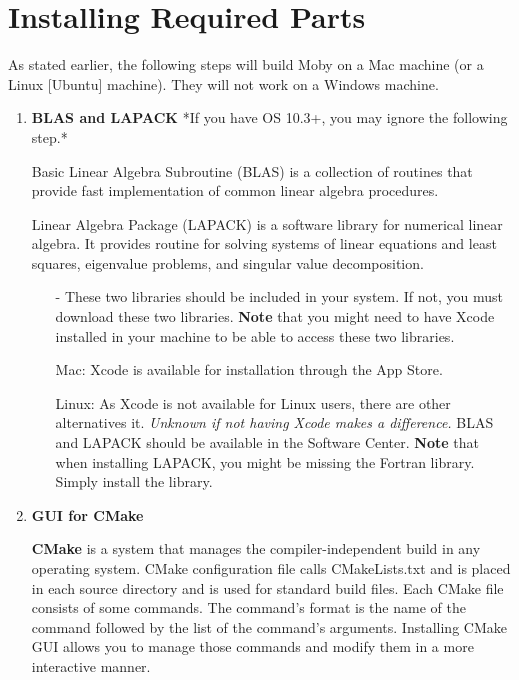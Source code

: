 \documentclass[11pt, letterpaper]{article}
\begin{document}
\section{Installing Required Parts}
As stated earlier, the following steps will build Moby on a Mac machine (or a Linux [Ubuntu] machine). They will not work on a Windows machine.

\begin{enumerate}
\item {\bfseries BLAS and LAPACK} 
\newline
*If you have OS 10.3+, you may ignore the following step.*

Basic Linear Algebra Subroutine (BLAS) is a collection of routines that provide fast implementation of common linear algebra procedures.

Linear Algebra Package (LAPACK) is a software library for numerical linear algebra. It provides routine for solving systems of linear equations and least squares, eigenvalue problems, and singular value decomposition.
\begin{itemize}
\item[-] These two libraries should be included in your system. If not, you must download these two libraries.
\newline
{\bfseries Note} that you might need to have Xcode installed in your machine to be able to access these two libraries.

Mac: Xcode is available for installation through the App Store.

Linux: As Xcode is not available for Linux users, there are other alternatives it.  {\em Unknown if not having Xcode makes a difference.} BLAS and LAPACK should be available in the Software Center. {\bfseries Note} that when installing LAPACK, you might be missing the Fortran library.  Simply install the library.
\end{itemize}

\item {\bfseries GUI for CMake}

{\bfseries CMake} is a system that manages the compiler-independent build in any operating system. CMake configuration file calls CMakeLists.txt and is placed in each source directory and is used for standard build files. Each CMake file consists of some commands.  The command's format is the name of the command followed by the list of the command's arguments. Installing CMake GUI allows you to manage those commands and modify them in a more interactive manner.


\end{enumerate}
\end{document}

